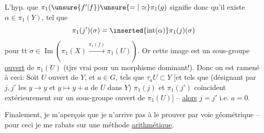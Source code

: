 L'hyp. que $\pi_1(\unsure{f'|f})\unsure{=|\simeq}\pi_1(g)$ signifie donc qu'il existe $\alpha\in\pi_1(Y)$, tel que
\[
\pi_1(j')(\sigma)=\inserted{\operatorname{int}(\alpha)}\pi_1(j)(\sigma)
\]
pour tt $\sigma\in\operatorname{Im}(\pi_1(X)\xrightarrow{\pi_1(f)}\pi_1(U))$. Or cette image est un sous-groupe \uline{ouvert} de $\pi_1(U)$ (tjrs vrai pour un morphisme dominant!).  Donc on est ramené à ceci: Soit $U$ ouvert \inserted{$\ne\varnothing$} de $Y$, et $a\in G$, tels que $\tau_aU\subset Y$ [et tels que (désignant par $j,j'$ les   $y\longrightarrow y$ et $y\longmapsto y+a$ de $U$ dans $Y$) $\pi_1(j)$ et $\pi_1(j')$ coïncident extérieurement sur un sous-groupe ouvert de $\pi_1(U)$] -- \uline{alors} $j=j'$ i.e. $a=0$.


Finalement, je m'aperçois que je n'arrive pas à le prouver par voie géométrique -- pour ceci je me rabats sur une méthode \uline{arithmétique}.

